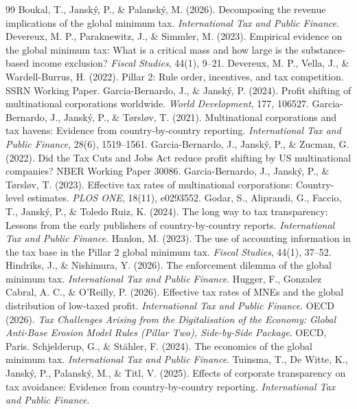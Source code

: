 \documentclass[11pt,a4paper]{article}
\begin{document}
{\footnotesize
\begin{thebibliography}{99}
 Boukal, T., Janský, P., \& Palanský, M. (2026). Decomposing the revenue implications of the global minimum tax. \emph{International Tax and Public Finance}.
 Devereux, M. P., Paraknewitz, J., \& Simmler, M. (2023). Empirical evidence on the global minimum tax: What is a critical mass and how large is the substance-based income exclusion? \emph{Fiscal Studies}, 44(1), 9–21.
 Devereux, M. P., Vella, J., \& Wardell-Burrus, H. (2022). Pillar 2: Rule order, incentives, and tax competition. SSRN Working Paper.
 Garcia-Bernardo, J., \& Janský, P. (2024). Profit shifting of multinational corporations worldwide. \emph{World Development}, 177, 106527.
 Garcia-Bernardo, J., Janský, P., \& T{\o}rsl{\o}v, T. (2021). Multinational corporations and tax havens: Evidence from country-by-country reporting. \emph{International Tax and Public Finance}, 28(6), 1519–1561.
 Garcia-Bernardo, J., Janský, P., \& Zucman, G. (2022). Did the Tax Cuts and Jobs Act reduce profit shifting by US multinational companies? NBER Working Paper 30086.
 Garcia-Bernardo, J., Janský, P., \& T{\o}rsl{\o}v, T. (2023). Effective tax rates of multinational corporations: Country-level estimates. \emph{PLOS ONE}, 18(11), e0293552.
 Godar, S., Aliprandi, G., Faccio, T., Janský, P., \& Toledo Ruiz, K. (2024). The long way to tax transparency: Lessons from the early publishers of country-by-country reports. \emph{International Tax and Public Finance}.
 Hanlon, M. (2023). The use of accounting information in the tax base in the Pillar 2 global minimum tax. \emph{Fiscal Studies}, 44(1), 37–52.
 Hindriks, J., \& Nishimura, Y. (2026). The enforcement dilemma of the global minimum tax. \emph{International Tax and Public Finance}.
 Hugger, F., Gonzalez Cabral, A. C., \& O'Reilly, P. (2026). Effective tax rates of MNEs and the global distribution of low-taxed profit. \emph{International Tax and Public Finance}.
 OECD (2026). \emph{Tax Challenges Arising from the Digitalisation of the Economy: Global Anti-Base Erosion Model Rules (Pillar Two), Side-by-Side Package}. OECD, Paris.
 Schjelderup, G., \& Stähler, F. (2024). The economics of the global minimum tax. \emph{International Tax and Public Finance}.
 Tuinsma, T., De Witte, K., Janský, P., Palanský, M., \& Titl, V. (2025). Effects of corporate transparency on tax avoidance: Evidence from country-by-country reporting. \emph{International Tax and Public Finance}.
\end{thebibliography}}
\end{document}
